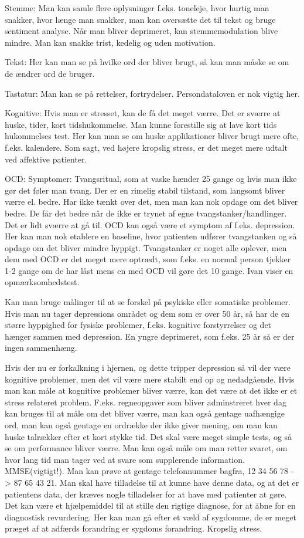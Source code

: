 Stemme: Man kan samle flere oplysninger f.eks. toneleje, hvor hurtig man snakker, hvor længe man snakker, man kan oversætte det til tekst og bruge sentiment analyse. Når man bliver deprimeret, kan stemmemodulation blive mindre. Man kan snakke trist, kedelig og uden motivation.

Tekst: Her kan man se på hvilke ord der bliver brugt, så kan man måske se om de ændrer ord de bruger. 

Tastatur: Man kan se på rettelser, fortrydelser. Persondataloven er nok vigtig her.

Kognitive: Hvis man er stresset, kan de få det meget værre. Det er sværre at huske, tider, kort tidshukommelse. Man kunne forestille sig at lave kort tids hukommelses test. Her kan man se om huske applikationer bliver brugt mere ofte, f.eks. kalendere. Som sagt, ved højere kropslig stress, er det meget mere udtalt ved affektive patienter.

OCD: Symptomer: Tvangsritual, som at vaske hænder 25 gange og hvis man ikke gør det føler man tvang. Der er en rimelig stabil tilstand, som langsomt bliver værre el. bedre. Har ikke tænkt over det, men man kan nok opdage om det bliver bedre. De får det bedre når de ikke er trynet af egne tvangstanker/handlinger. Det er lidt sværre at gå til. OCD kan også være et symptom af f.eks. depression. Her kan man nok etablere en baseline, hvor patienten udfører tvangstanken og så opdage om det bliver mindre hyppigt. Tvangstanker er noget alle oplever, men dem med OCD er det meget mere optrædt, som f.eks. en normal person tjekker 1-2 gange om de har låst mens en med OCD vil gøre det 10 gange. 
Ivan viser en opmærksomhedstest.

Kan man bruge målinger til at se forskel på psykiske eller somatiske problemer. Hvis man nu tager depressions området og dem som er over 50 år, så har de en større hyppighed for fysiske problemer, f.eks. kognitive forstyrrelser og det hænger sammen med depression. En yngre deprimeret, som f.eks. 25 år så er der ingen sammenhæng.

Hvis der nu er forkalkning i hjernen, og dette tripper depression så vil der være kognitive problemer, men det vil være mere stabilt end op og nedadgående. Hvis man kan måle at kognitive problemer bliver værre, kan det være at det ikke er et stress relateret problem. F.eks. regneopgaver som bliver adminstreret hver dag kan bruges til at måle om det bliver værre, man kan også gentage uafhængige ord, man kan også gentage en ordrække der ikke giver mening, om man kan huske talrækker efter et kort stykke tid. Det skal være meget simple tests, og så se om performance bliver værre. Man kan også måle om man retter svaret, om hvor lang tid man tager ved at svare som supplerende information. MMSE(vigtigt!). Man kan prøve at gentage telefonnummer bagfra, 12 34 56 78 -> 87 65 43 21. Man skal have tilladelse til at kunne have denne data, og at det er patientens data, der kræves nogle tilladelser for at have med patienter at gøre. Det kan være et hjælpemiddel til at stille den rigtige diagnose, for at åbne for en diagnostisk revurdering. Her kan man gå efter et væld af sygdomme, de er meget præget af at adfærds forandring er sygdoms forandring. Kropslig stress. 

